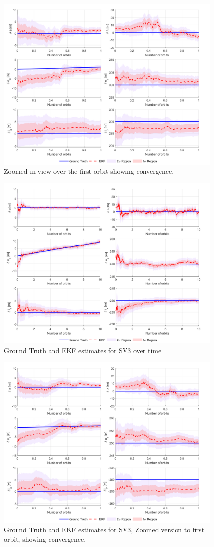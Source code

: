 \begin{figure}[H]
    \centering
    \includegraphics[width=0.8\linewidth]{sim/figures/PS8/ROE_over_time_SV2_comparison_zoomed.png}
    \caption{Zoomed-in view over the first orbit showing convergence.}
    \label{fig:sv2_ekf_estimates_zoom}
\end{figure}

\begin{figure}[H]
    \centering
    \includegraphics[width=0.7\linewidth]{sim/figures/PS8/ROE_over_time_SV3_comparison.png}
    \caption{Ground Truth and EKF estimates for SV3 over time}
    \label{fig:sv3_ekf_estimates}
\end{figure}

\begin{figure}[H]
    \centering
    \includegraphics[width=0.7\linewidth]{sim/figures/PS8/ROE_over_time_SV3_comparison_zoomed.png}
    \caption{Ground Truth and EKF estimates for SV3, Zoomed version to first orbit, showing convergence.}
    \label{fig:sv3_ekf_estimates_zoom}
\end{figure}

